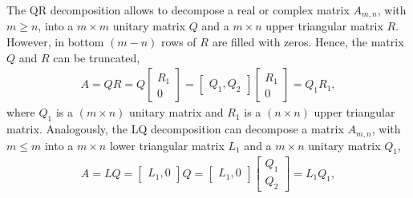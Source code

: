 The QR decomposition allows to decompose a real or complex matrix $A_{m,n}$, with $m \geq n$, into a $m \times m$ unitary matrix $Q$ and a $m \times n$ upper triangular matrix $R$. However, in bottom $(m-n)$ rows of $R$ are filled with zeros. Hence, the matrix $Q$ and $R$ can be truncated,
\begin{align}
	A = QR = Q \begin{bmatrix} R_1 \\ 0 \end{bmatrix} = \begin{bmatrix} Q_1, Q_2 \end{bmatrix} \begin{bmatrix} R_1 \\ 0 \end{bmatrix} = Q_1 R_1, 
\end{align}
where $Q_1$ is a $(m \times n)$ unitary matrix and $R_1$ is a $(n \times n)$ upper triangular matrix. Analogously, the LQ decomposition can decompose a matrix $A_{m,n}$, with $m \leq m$ into a $m \times n$ lower triangular matrix $L_1$ and a $m \times n$ unitary matrix $Q_1$, 
\begin{align}
	A = LQ = \begin{bmatrix} L_1, 0 \end{bmatrix} Q = \begin{bmatrix}  L_1, 0\end{bmatrix} \begin{bmatrix} Q_1 \\ Q_2 \end{bmatrix} = L_1 Q_1, 
\end{align}

